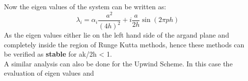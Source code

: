 \documentclass[a4paper,12pt]{report}
\begin{document}
Now the eigen values of the system can be written as:
$$\lambda_i = \alpha_i\frac{a^2}{(4h)^2}+i\frac{a}{2h}\sin(2\pi ph)$$
As the eigen values either lie on the left hand side of the argand plane and completely inside the region of Runge Kutta methods, hence these methods can be verified as \textbf{stable} for ak/2h < 1.\\
A similar analysis can also be done for the Upwind Scheme. In this case the evaluation of eigen values and 
\end{document}
